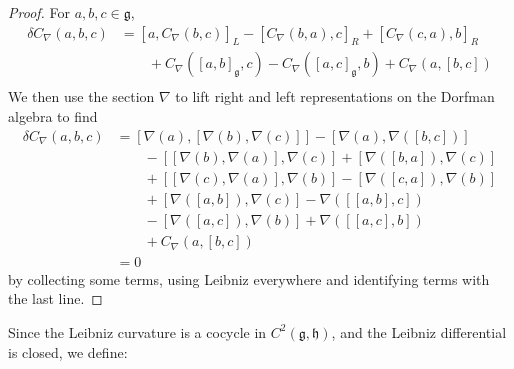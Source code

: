 \begin{proof}
    For $a,b,c \in \mathfrak{g}$,
    \begin{align*}
        \delta C_\nabla(a,b,c) &= [a, C_\nabla(b,c)]_L - [C_\nabla(b,a), c]_R + [C_\nabla(c,a),b]_R \\
        & \qquad + C_\nabla( [a,b]_\mathfrak{g}, c ) - C_\nabla([a,c]_\mathfrak{g},b)
        + C_\nabla(a, [b,c])\\
    \end{align*}
    We then use the section $\nabla$ to lift right and left representations on the Dorfman algebra to find
    \begin{align*}
        \delta C_\nabla(a,b,c) &= \left[\nabla(a) , [\nabla(b), \nabla(c)] \right] - 
        \left[\nabla(a), \nabla([b,c])\right]\\
        & \qquad - \left[ [\nabla(b), \nabla(a)], \nabla(c)\right] +
        \left[\nabla([b,a]), \nabla(c)\right]\\
        & \qquad +\left[[\nabla(c), \nabla(a)], \nabla(b)\right] 
        - \left[\nabla([c,a]), \nabla(b)\right]\\
        & \qquad + \left[\nabla([a,b]), \nabla(c)\right]
        - \nabla\left( \left[ [a,b], c\right]\right)\\
        & \qquad - \left[ \nabla([a,c]), \nabla(b)\right]
        + \nabla\left( \left[ [a,c],b\right]\right)\\
        & \qquad + C_\nabla(a,[b,c])\\
        &=0 
    \end{align*}
    by collecting some terms, using Leibniz everywhere and identifying terms with the last line.
\end{proof}
% 
Since the Leibniz curvature is a cocycle in $C^2(\mathfrak{g,h})$, and the Leibniz differential is closed, we define:
\label{def:Characteristic class of Dorfman algebra}
